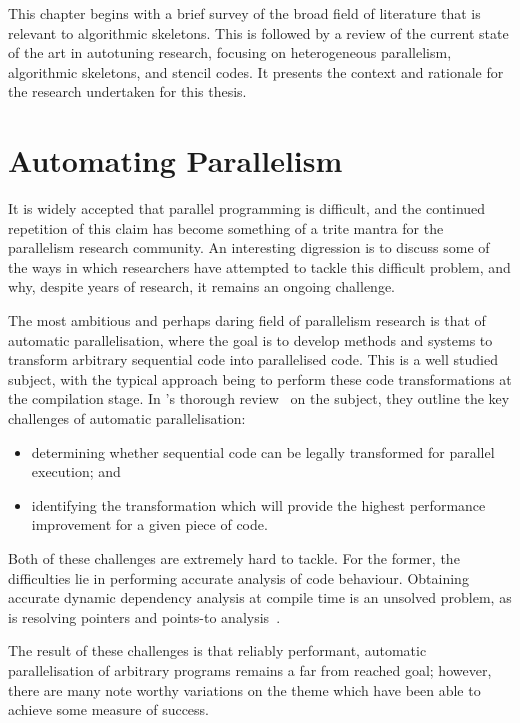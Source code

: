 This chapter begins with a brief survey of the broad field of
literature that is relevant to algorithmic skeletons. This is followed
by a review of the current state of the art in autotuning research,
focusing on heterogeneous parallelism, algorithmic skeletons, and
stencil codes. It presents the context and rationale for the research
undertaken for this thesis.


\section{Automating Parallelism}

It is widely accepted that parallel programming is difficult, and the
continued repetition of this claim has become something of a trite
mantra for the parallelism research community. An interesting
digression is to discuss some of the ways in which researchers have
attempted to tackle this difficult problem, and why, despite years of
research, it remains an ongoing challenge.

The most ambitious and perhaps daring field of parallelism research is
that of automatic parallelisation, where the goal is to develop
methods and systems to transform arbitrary sequential code into
parallelised code. This is a well studied subject, with the typical
approach being to perform these code transformations at the
compilation stage. In \citeauthor{Banerjee1993}'s thorough
review~\cite{Banerjee1993} on the subject, they outline the key
challenges of automatic parallelisation:
%
\begin{itemize}
  \item determining whether sequential code can be legally transformed
  for parallel execution; and
  \item identifying the transformation which will provide the highest
  performance improvement for a given piece of code.
\end{itemize}
%
Both of these challenges are extremely hard to tackle. For the former,
the difficulties lie in performing accurate analysis of code
behaviour. Obtaining accurate dynamic dependency analysis at compile
time is an unsolved problem, as is resolving pointers and points-to
analysis~\cite{Atkin-granville2013, Hind2001,Ghiya2001}.

The result of these challenges is that reliably performant, automatic
parallelisation of arbitrary programs remains a far from reached goal;
however, there are many note worthy variations on the theme which have
been able to achieve some measure of success.

